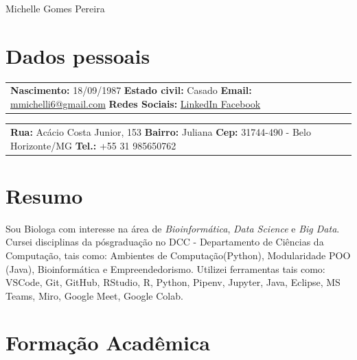 \documentclass[paper=a4,fontsize=11pt]{scrartcl} %
\newcommand{\MyName}[1]{ %
                \Huge \hfill #1
                \par \normalsize \normalfont}
\newcommand{\NewPart}[1]{\section*{{#1}}}
\begin{document}

\MyName{Michelle Gomes Pereira}



\NewPart{Dados pessoais}{}
\begin{minipage}{0.55\textwidth}
	\begin{tabular}{|p{\textwidth}}
		\textbf{Nascimento:} 18/09/1987 \newline
		\textbf{Estado civil:} Casado \newline
		\textbf{Email:} \href{mailto:mmichelli6@gmail.com}{mmichelli6@gmail.com} \newline
		\textbf{Redes Sociais:} \newline
		\href{https://www.linkedin.com/in/michellegomespereira/}{LinkedIn }
		\href{https://www.facebook.com/michelle.gomes.904}{ Facebook}
	\end{tabular}
\end{minipage}%
\begin{minipage}{0.45\textwidth}
	\begin{tabular}{|p{\textwidth}}
		\textbf{Rua:} Acácio Costa Junior, 153 \newline
		\textbf{Bairro:} Juliana \newline
		\textbf{Cep:} 31744-490 - Belo Horizonte/MG \newline
		\textbf{Tel.:} +55 31 985650762 \newline
	\end{tabular}
\end{minipage}%


\NewPart{Resumo}{}
Sou Biologa com interesse na área de \textit{Bioinformática}, \textit{Data Science} e \textit{Big Data}. Cursei disciplinas da 
pósgraduação no DCC - Departamento de Ciências da Computação, tais como: Ambientes de Computação(Python), Modularidade POO (Java), 
Bioinformática e Empreendedorismo. Utilizei ferramentas tais como: VSCode, Git, GitHub, RStudio, R, Python, Pipenv, Jupyter, Java, Eclipse, 
MS Teams, Miro, Google Meet, Google Colab.


\NewPart{Formação Acadêmica}{}
\end{document}
